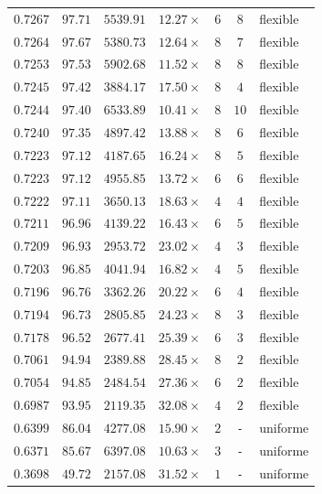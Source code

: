 {\begin{longtable}{@{}r r r r c c l@{}}
    $0.7267$ & $97.71$ & $5539.91$ & $12.27\times$ & $6$ & $8$ & flexible \\
    $0.7264$ & $97.67$ & $5380.73$ & $12.64\times$ & $8$ & $7$ & flexible \\
    $0.7253$ & $97.53$ & $5902.68$ & $11.52\times$ & $8$ & $8$ & flexible \\
    $0.7245$ & $97.42$ & $3884.17$ & $17.50\times$ & $8$ & $4$ & flexible \\
    $0.7244$ & $97.40$ & $6533.89$ & $10.41\times$ & $8$ & $10$ & flexible \\
    $0.7240$ & $97.35$ & $4897.42$ & $13.88\times$ & $8$ & $6$ & flexible \\
    $0.7223$ & $97.12$ & $4187.65$ & $16.24\times$ & $8$ & $5$ & flexible \\
    $0.7223$ & $97.12$ & $4955.85$ & $13.72\times$ & $6$ & $6$ & flexible \\
    $0.7222$ & $97.11$ & $3650.13$ & $18.63\times$ & $4$ & $4$ & flexible \\
    $0.7211$ & $96.96$ & $4139.22$ & $16.43\times$ & $6$ & $5$ & flexible \\
    $0.7209$ & $96.93$ & $2953.72$ & $23.02\times$ & $4$ & $3$ & flexible \\
    $0.7203$ & $96.85$ & $4041.94$ & $16.82\times$ & $4$ & $5$ & flexible \\
    $0.7196$ & $96.76$ & $3362.26$ & $20.22\times$ & $6$ & $4$ & flexible \\
    $0.7194$ & $96.73$ & $2805.85$ & $24.23\times$ & $8$ & $3$ & flexible \\
    $0.7178$ & $96.52$ & $2677.41$ & $25.39\times$ & $6$ & $3$ & flexible \\
    $0.7061$ & $94.94$ & $2389.88$ & $28.45\times$ & $8$ & $2$ & flexible \\
    $0.7054$ & $94.85$ & $2484.54$ & $27.36\times$ & $6$ & $2$ & flexible \\
    $0.6987$ & $93.95$ & $2119.35$ & $32.08\times$ & $4$ & $2$ & flexible \\
    $0.6399$ & $86.04$ & $4277.08$ & $15.90\times$ & $2$ & \texttt{-} & uniforme \\
    $0.6371$ & $85.67$ & $6397.08$ & $10.63\times$ & $3$ & \texttt{-} & uniforme \\
    $0.3698$ & $49.72$ & $2157.08$ & $31.52\times$ & $1$ & \texttt{-} & uniforme \\
\end{longtable}
}
